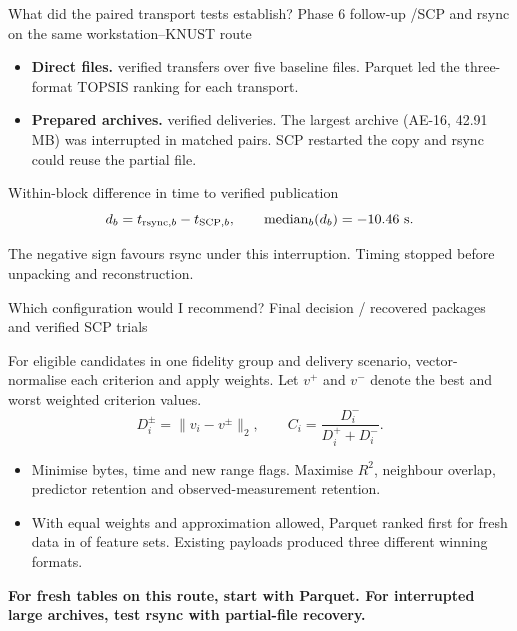 \documentclass[aspectratio=169,11pt]{beamer}
\newcommand{\phase}[1]{{\small\color{forest}#1}\par\medskip}
\newcommand{\takeaway}[1]{\par\medskip{\color{gold}\rule{8mm}{1.6pt}}\enspace\textbf{#1}\par}
\begin{document}
\begin{frame}{What did the paired transport tests establish?}
\phase{Phase 6 follow-up \enspace/\enspace SCP and rsync on the same workstation--KNUST route}
\begin{itemize}
\item \textbf{Direct files.} \studyDirect{} verified transfers over five baseline files. Parquet led the three-format TOPSIS ranking for each transport.
\item \textbf{Prepared archives.} \studyArchives{} verified deliveries. The largest archive (AE-16, 42.91 MB) was interrupted in \studyPairs{} matched pairs. SCP restarted the copy and rsync could reuse the partial file.
\end{itemize}
\begin{block}{Within-block difference in time to verified publication}
\[
 d_b=t_{\mathrm{rsync},b}-t_{\mathrm{SCP},b},\qquad
 \operatorname{median}_{b}(d_b)=-10.46\ \mathrm{s}.
\]
\end{block}
The negative sign favours rsync under this interruption. Timing stopped before unpacking and reconstruction.
\end{frame}

\begin{frame}{Which configuration would I recommend?}
\phase{Final decision \enspace/\enspace \studyPackages{} recovered packages and \studyTransfers{} verified SCP trials}
For eligible candidates in one fidelity group and delivery scenario, vector-normalise each criterion and apply weights. Let $v^+$ and $v^-$ denote the best and worst weighted criterion values.
\[
 D_i^{\pm}=\lVert v_i-v^{\pm}\rVert_2,\qquad
 C_i=\frac{D_i^-}{D_i^++D_i^-}.
\]
\begin{itemize}
\item Minimise bytes, time and new range flags. Maximise $R^2$, neighbour overlap, predictor retention and observed-measurement retention.
\item With equal weights and approximation allowed, Parquet ranked first for fresh data in \studyParquetWins{} of \studyGroups{} feature sets. Existing payloads produced three different winning formats.
\end{itemize}
\takeaway{For fresh tables on this route, start with Parquet. For interrupted large archives, test rsync with partial-file recovery.}
\end{frame}
\end{document}

